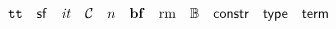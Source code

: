 \documentclass{easychair}
\begin{document}
\[ \mathtt{tt}\quad
   \mathsf{sf}\quad
   \mathit{it}\quad
   \mathcal{C}\quad
   \mathnormal{n}\quad
   \mathbf{bf}\quad
   \mathrm{rm}\quad
   \mathbb{B}\quad
   \mathsf{constr}\quad
   \mathsf{type}\quad
   \mathsf{term}\quad
\]
\end{document}
